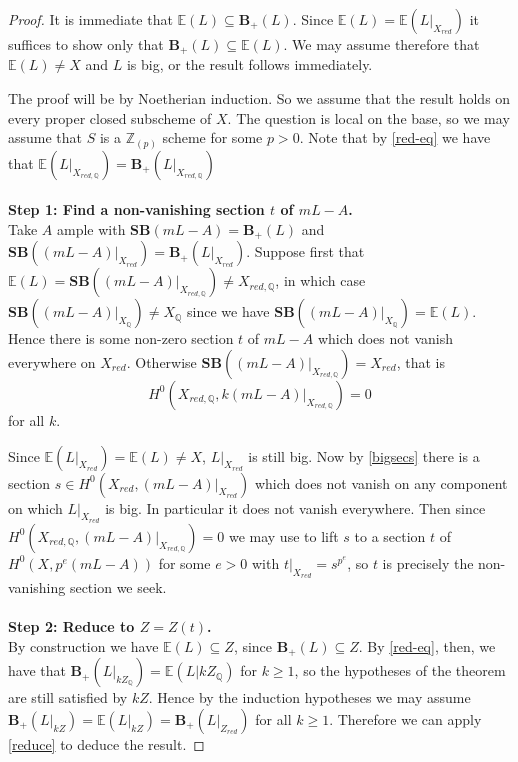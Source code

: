 \documentclass[a4paper,12pt]{book}
\newcommand{\SB}{\mathbf{SB}}
\newcommand{\BS}{\mathbf{B}_{+}}
\begin{document}
\begin{proof}
	
	It is immediate that $\mathbb{E}(L)\subseteq \BS(L)$. Since $\mathbb{E}(L)=\mathbb{E}(L|_{X_{red}})$ it suffices to show only that $\BS(L) \subseteq \mathbb{E}(L)$. We may assume therefore that $\mathbb{E}(L) \neq X$ and $L$  is big, or the result follows immediately.
	
	The proof will be by Noetherian induction. So we assume that the result holds on every proper closed subscheme of $X$. The question is local on the base, so we may assume that $S$ is a $\mathbb{Z}_{(p)}$ scheme for some $p > 0$. Note that by \autoref{red-eq} we have that $\mathbb{E}(L|_{X_{red,\mathbb{Q}}})=\BS(L|_{X_{red,\mathbb{Q}}})$\\
	\\
	\textbf{Step 1: Find a non-vanishing section $t$ of $mL-A$.}\\
	
	Take $A$ ample with $\SB(mL-A)=\BS(L)$ and $\SB((mL-A)|_{X_{red}})=\BS(L|_{X_{red}})$. Suppose first that $\mathbb{E}(L)=\SB((mL-A)|_{X_{red,\mathbb{Q}}}) \neq X_{red,\mathbb{Q}}$, in which case $\SB((mL-A)|_{X_{\mathbb{Q}}}) \neq X_{\mathbb{Q}}$ since we have $\SB((mL-A)|_{X_{\mathbb{Q}}})=\mathbb{E}(L)$. Hence there is some non-zero section $t$ of $mL-A$ which does not vanish everywhere on $X_{red}$. Otherwise $\SB((mL-A)|_{X_{red,\mathbb{Q}}}) = X_{red}$, that is $$H^{0}(X_{red,\mathbb{Q}},k(mL-A)|_{X_{red,\mathbb{Q}}}) =0$$ for all $k$. 
	
	Since $\mathbb{E}(L|_{X_{red}})=\mathbb{E}(L) \neq X$, $L|_{X_{red}}$ is still big. Now by \autoref{bigsecs} there is a section $s\in H^{0}(X_{red},(mL-A)|_{X_{red}})$ which does not vanish on any component on which $L|_{X_{red}}$ is big. In particular it does not vanish everywhere. Then since $H^{0}(X_{red,\mathbb{Q}},(mL-A)|_{X_{red,\mathbb{Q}}}) =0$ we may use \cite[Proposition 3.5]{witaszek2020keel} to lift $s$ to a section $t$ of $H^{0}(X,p^{e}(mL-A))$ for some $e > 0$ with $t|_{X_{red}}=s^{p^{e}}$, so $t$ is precisely the non-vanishing section we seek.\\
	\\
	\textbf{Step 2: Reduce to $Z=Z(t)$.}\\
	
	By construction we have $\mathbb{E}(L)\subseteq Z$, since $\BS(L) \subseteq Z$. By \autoref{red-eq}, then, we have that $\BS(L|_{kZ_{\mathbb{Q}}})=\mathbb{E}(L|{kZ_{\mathbb{Q}}})$ for $k \geq 1$, so the hypotheses of the theorem are still satisfied by $kZ$. Hence by the induction hypotheses we may assume $\BS(L|_{kZ})=\mathbb{E}(L|_{kZ})=\BS(L|_{Z_{red}})$ for all $k \geq 1$. Therefore we can apply \autoref{reduce} to deduce the result.
\end{proof}
\end{document}
